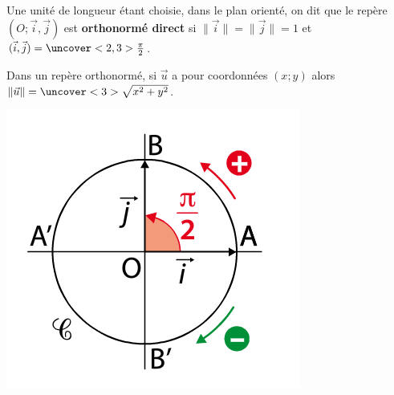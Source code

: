 \documentclass{beamer}
\theoremstyle{plain}
\begin{document}
 \begin{frame}
 \begin{definition}
  Une unité de longueur étant choisie, dans le plan orienté, on dit que le repère $(O;\vec{i},\vec{j})$
  est \textbf{orthonormé direct} si $\| \vec{i} \|=\| \vec{j}\|=1$ et 
  $(\vec{i},\vec{j})=\uncover<2,3>{\frac{\pi}{2}}$.
  
  Dans un repère orthonormé, si $\vec{u}$ a pour coordonnées $(x;y)$ alors $\|\vec{u}\|=
  \uncover<3>{\sqrt{x^2+y^2}}$.
  
   \begin{center}
    \includegraphics[scale=0.5]{../Images/repereOrthoDirect.png}
  \end{center}
  
 \end{definition}
 
 \end{frame}
 
\end{document}
